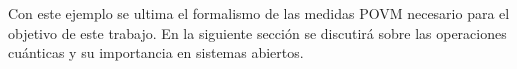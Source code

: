 \begin{comment}
\subsubsection{El teorema de Naimark} %
En esta sección se habla de que las medidas POVM pueden interpretarse como una
medidas proyectivas en un espacio de mayor dimensión.  Dado cualquier POVM puro
con $k$ elementos y un estado $\rho$ en un espacio de Hilbert de dimensión $d$,
se puede encontrar un estado $\rho \otimes \rho_0$ en un espacio de Hilbert
$\mathcal{H}\otimes\mathcal{H'}$ tal que las estadísticas de la medición POVM
original se reproducen exactamente mediante una medida proyectiva de $\rho
\otimes \rho_0$. Esta afirmación es consecuencia del teorema del Naimark
{\cite{2007geometry}}.

\begin{theorem}[\textbf{Teorema de Naimark}] 
Cualquier POVM $\{E_i\}$ en el espacio de Hilbert $\mathcal{H}$, existe una
medida proyectiva PVM $\{P_i\}$ en un espacio de Hilbert más grande
$\mathcal{K}$, de tal manera que $E_i=\Pi^\dagger P_i\Pi$, donde $\Pi$ proyecta
desde $\mathcal{K}$ hacia $\mathcal{H}$.
\end{theorem}
	

Una forma de construir los operadores $\{P_i\}$ es tomar  $P _{i}=\mathds{1} _{H}\otimes
|i\rangle \langle i|_{H'}$ y
$\Pi=\sum _{i=1}^{n}{\sqrt {E_{i}} }_{H}\otimes {|i\rangle }_{H'}$ en el espacio $\mathcal{K}=\mathcal{H}\otimes\mathcal{H'}$. La
probabilidad de obtener la salida $i$ con estos operadores PVM, es la misma a
la probabilidad de obtener esta con el POVM original {\cite{2007geometry}}
\begin{equation}
 \begin{split}
 p_i&=\tr \left(\Pi\rho\Pi^{\dagger }P _{i}\right)\\
 &=\tr \left(\Pi\rho \Pi^{\dagger }\left[\mathds{1}_{H}\otimes |i\rangle \langle i|_{H'}\right]\right)\\
 &=\tr \left(\rho\left(\sum _{j=1}^{n}{\sqrt {E{j} }}_{H}^{\dagger }\otimes {\langle j|}_{H'}\right)\mathds{1} _{H}\otimes |i\rangle \langle i|_{B}\left(\sum _{k=1}^{n}{\sqrt {E_{k} }}_{H}\otimes {|k\rangle }_{H'}\right)\right)\\
 &=\tr \left(\rho {\sqrt {E_{i} }}_{H}\mathds{1} _{H}{\sqrt {E_{i} }}_{H}\right)\\
 &=\tr (\rho E_{i}).
 \end{split}
\end{equation}
\end{comment}
Con este ejemplo se ultima el formalismo de las medidas POVM necesario para el objetivo de este trabajo. En la siguiente sección se discutirá sobre las operaciones cuánticas y su importancia en sistemas abiertos.






















